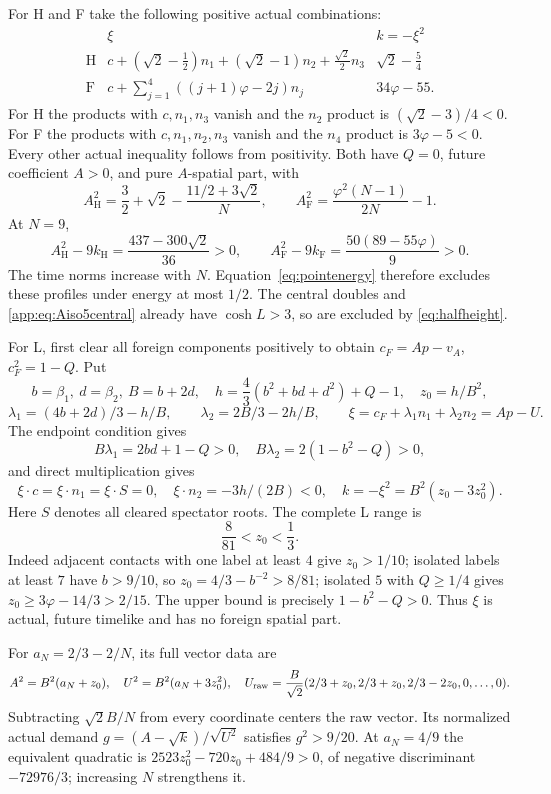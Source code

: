 \documentclass[11pt]{article}
\theoremstyle{definition}
\theoremstyle{remark}
\newcommand{\ph}{\varphi}
\begin{document}
For H and F take the following positive actual combinations:
\[
\begin{array}{c|c|c}
 &\xi&k=-\xi^2\\ \hline
 \mathrm H&
 c+(\sqrt2-\tfrac12)n_1+(\sqrt2-1)n_2+
                         \tfrac{\sqrt2}2n_3&
 \sqrt2-\tfrac54\\
 \mathrm F&
 c+\displaystyle\sum_{j=1}^4((j+1)\ph-2j)n_j&
 34\ph-55 .
\end{array}
\]
For H the products with \(c,n_1,n_3\) vanish and the \(n_2\)
product is \((\sqrt2-3)/4<0\). For F the products with
\(c,n_1,n_2,n_3\) vanish and the \(n_4\) product is \(3\ph-5<0\).
Every other actual inequality follows from positivity. Both have
\(Q=0\), future coefficient \(A>0\), and pure \(A\)-spatial part,
with
\[
 A_{\mathrm H}^2=\frac32+\sqrt2-\frac{11/2+3\sqrt2}{N},
 \qquad
 A_{\mathrm F}^2=\frac{\ph^2(N-1)}{2N}-1.
\]
At \(N=9\),
\[
 A_{\mathrm H}^2-9k_{\mathrm H}
   =\frac{437-300\sqrt2}{36}>0,\qquad
 A_{\mathrm F}^2-9k_{\mathrm F}
   =\frac{50(89-55\ph)}9>0.
\]
The time norms increase with \(N\). Equation~\eqref{eq:pointenergy}
therefore excludes these profiles under energy at most \(1/2\).
The central doubles and \eqref{app:eq:Aiso5central} already have
\(\cosh L>3\), so are excluded by \eqref{eq:halfheight}.

For L, first clear all foreign components positively to obtain
\(c_F=A p-v_A\), \(c_F^2=1-Q\). Put
\[
 b=\beta_1,\ d=\beta_2,\ B=b+2d,\quad
 h=\frac43(b^2+bd+d^2)+Q-1,\quad z_0=h/B^2,
\]
\[
 \lambda_1=(4b+2d)/3-h/B,\qquad
 \lambda_2=2B/3-2h/B,\qquad
 \xi=c_F+\lambda_1n_1+\lambda_2n_2=A p-U .
\]
The endpoint condition gives
\[
 B\lambda_1=2bd+1-Q>0,\quad
 B\lambda_2=2(1-b^2-Q)>0,
\]
and direct multiplication gives
\[
 \xi\cdot c=\xi\cdot n_1=\xi\cdot S=0,\quad
 \xi\cdot n_2=-3h/(2B)<0,\quad
 k=-\xi^2=B^2(z_0-3z_0^2).
\]
Here \(S\) denotes all cleared spectator roots. The complete L
range is
\begin{equation}\label{app:eq:Ldomain}
 \frac8{81}<z_0<\frac13.
\end{equation}
Indeed adjacent contacts with one label at least \(4\) give
\(z_0>1/10\); isolated labels at least \(7\) have \(b>9/10\),
so \(z_0=4/3-b^{-2}>8/81\); isolated \(5\) with \(Q\ge1/4\)
gives \(z_0\ge3\ph-14/3>2/15\).
The upper bound is precisely \(1-b^2-Q>0\).
Thus \(\xi\) is actual, future timelike and has no foreign spatial part.

For \(a_N=2/3-2/N\), its full vector data are
\begin{equation}\label{app:eq:Lvector}
 A^2=B^2(a_N+z_0),\quad
 U^2=B^2(a_N+3z_0^2),\quad
 U_{\rm raw}=\frac B{\sqrt2}(2/3+z_0,2/3+z_0,2/3-2z_0,0,\ldots,0).
\end{equation}
Subtracting \(\sqrt2 B/N\) from every coordinate centers the raw
vector. Its normalized actual demand
\(g=(A-\sqrt k)/\sqrt{U^2}\) satisfies \(g^2>9/20\).
At \(a_N=4/9\) the equivalent quadratic is
\(2523z_0^2-720z_0+484/9>0\), of negative discriminant
\(-72976/3\); increasing \(N\) strengthens it.
\end{document}
